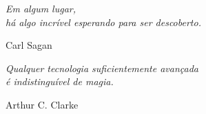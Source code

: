 \begin{agradecimentos}






\end{agradecimentos}

\begin{epigrafe}
    \vspace*{\fill}
	\begin{flushright}
		\textit{Em algum lugar, \\ há algo incrível esperando para ser descoberto.}
        
        Carl Sagan

		\textit{Qualquer tecnologia suficientemente avançada \\
		é indistinguível de magia.}
        
        Arthur C. Clarke
	\end{flushright}
\end{epigrafe}

